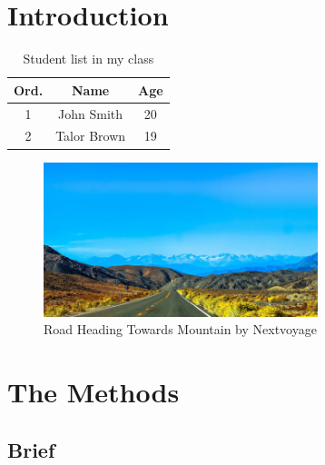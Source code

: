 \documentclass[12pt]{article}
\begin{document}
\tableofcontents
\listoftables
\listoffigures
\lstlistoflistings



\newpage
\section{Introduction}



\blindtext


\begin{table}[ht]
\centering
    \begin{tabular}{c | c | c}
        Ord. & Name & Age \\
        \hline
        1 & John Smith & 20 \\
        2 & Talor Brown & 19
    \end{tabular}
\caption{Student list in my class}
\label{tab:student_list_in_my_class}
\end{table}


\blindtext


\begin{figure}[ht]
    \centering
    \includegraphics[width=8cm]{img/nextvoyage-road-moutain.jpg}
    \caption{Road Heading Towards Mountain by Nextvoyage}
    \label{fig:purple flower}
\end{figure}


\Blindtext[2]



\section{The Methods}



\subsection{Brief}
\end{document}
